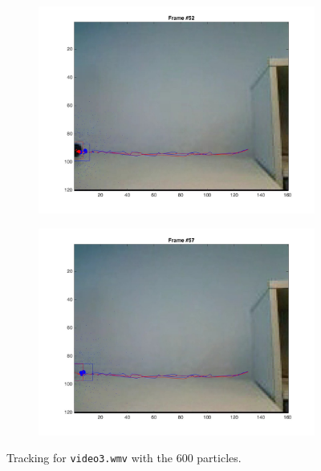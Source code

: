 \documentclass{ethz_report}
\begin{document}
\begin{figure}[h]
\begin{subfigure}[b]{.25\textwidth}
        \includegraphics[width=1\linewidth]{images/video3_particles_high_51}
    \end{subfigure}%
    \begin{subfigure}[b]{.25\textwidth}
        \centering
        \includegraphics[width=1\linewidth]{images/video3_particles_high_56}
    \end{subfigure}
    \caption{Tracking for \texttt{video3.wmv} with the 600 particles.}
    \label{fig:tracking_video3_particles_high}
\end{figure}
\end{document}
